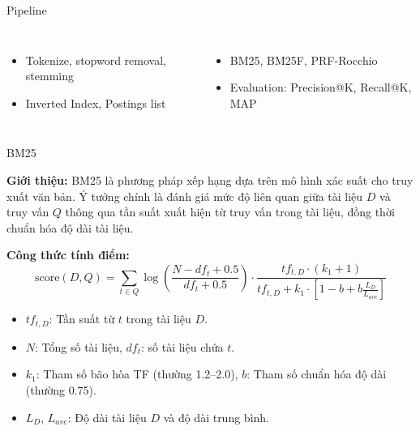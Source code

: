 \documentclass[10pt,aspectratio=169]{beamer}
\begin{document}
\begin{frame}{Pipeline}
\vspace{-0.5em}
\centering
{}

\vspace{1em}
\begin{columns}[T,onlytextwidth]
\begin{itemize}
    \item Tokenize, stopword removal, stemming
    \item Inverted Index, Postings list
\end{itemize}
\begin{itemize}
    \item BM25, BM25F, PRF-Rocchio
    \item Evaluation: Precision@K, Recall@K, MAP
\end{itemize}
\end{columns}
\end{frame}

\begin{frame}{BM25}
\begin{tcolorbox}[colback=lightblue,boxrule=0pt]
\textbf{Giới thiệu:}
BM25 là phương pháp xếp hạng dựa trên mô hình xác suất cho truy xuất văn bản. Ý tưởng chính là đánh giá mức độ liên quan giữa tài liệu $D$ và truy vấn $Q$ thông qua tần suất xuất hiện từ truy vấn trong tài liệu, đồng thời chuẩn hóa độ dài tài liệu.
\end{tcolorbox}

\vspace{0.7em}

\textbf{Công thức tính điểm:}
\[
\text{score}(D, Q) = \sum_{t \in Q}
\log\left(\frac{N-df_t+0.5}{df_t+0.5}\right) \cdot
\frac{tf_{t,D} \cdot (k_1 + 1)}{tf_{t,D} + k_1 \cdot \left[1-b+b\frac{L_D}{L_{ave}}\right]}
\]
\begin{itemize}
    \item $tf_{t,D}$: Tần suất từ $t$ trong tài liệu $D$.
    \item $N$: Tổng số tài liệu, $df_t$: số tài liệu chứa $t$.
    \item $k_1$: Tham số bão hòa TF (thường 1.2--2.0), $b$: Tham số chuẩn hóa độ dài (thường 0.75).
    \item $L_D$, $L_{ave}$: Độ dài tài liệu $D$ và độ dài trung bình.
\end{itemize}
\end{frame}
\end{document}

